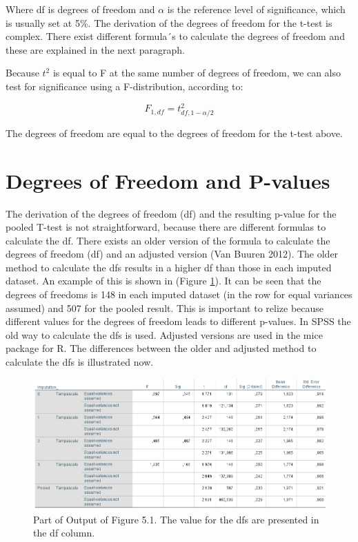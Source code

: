 \documentclass[]{book}
\theoremstyle{definition}
\theoremstyle{definition}
\theoremstyle{definition}
\theoremstyle{remark}
\begin{document}
Where df is degrees of freedom and \(\alpha\) is the reference level of
significance, which is usually set at 5\%. The derivation of the degrees
of freedom for the t-test is complex. There exist different formula´s to
calculate the degrees of freedom and these are explained in the next
paragraph.

Because \(t^2\) is equal to F at the same number of degrees of freedom,
we can also test for significance using a F-distribution, according to:

\begin{equation}
F_{1, df}=t^2_{df,1-\alpha/2}
  \label{eq:f-distr}
\end{equation}

The degrees of freedom are equal to the degrees of freedom for the
t-test above.

\section{Degrees of Freedom and
P-values}\label{degrees-of-freedom-and-p-values}

The derivation of the degrees of freedom (df) and the resulting p-value
for the pooled T-test is not straightforward, because there are
different formulas to calculate the df. There exists an older version of
the formula to calculate the degrees of freedom (df) and an adjusted
version (Van Buuren 2012). The older method to calculate the dfs results
in a higher df than those in each imputed dataset. An example of this is
shown in (Figure \ref{fig:tab9-3}). It can be seen that the degrees of
freedoms is 148 in each imputed dataset (in the row for equal variances
assumed) and 507 for the pooled result. This is important to relize
because different values for the degrees of freedom leads to different
p-values. In SPSS the old way to calculate the dfs is used. Adjusted
versions are used in the mice package for R. The differences between the
older and adjusted method to calculate the dfs is illustrated now.

\begin{figure}

{\centering \includegraphics[width=0.9\linewidth]{images/table5.2} 

}

\caption{Part of Output of Figure 5.1. The value for the dfs are presented in the df column.}\label{fig:tab9-3}
\end{figure}
\end{document}
